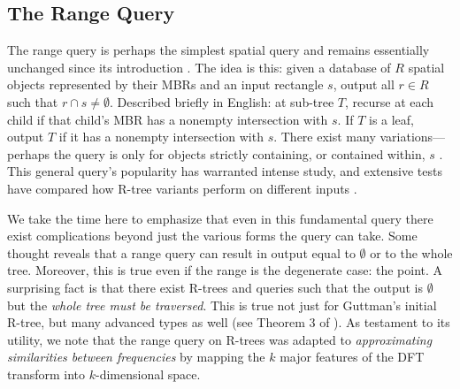 \subsection{The Range Query}
The range query is perhaps the simplest spatial query and remains essentially unchanged since its introduction \cite{guttman84}.
The idea is this: given a database of $R$ spatial objects represented by their MBRs and an input rectangle $s$, output all $r\in R$ such that $r\cap s\neq\emptyset$.
Described briefly in English: at sub-tree $T$, recurse at each child if that child's MBR has a nonempty intersection with $s$.
If $T$ is a leaf, output $T$ if it has a nonempty intersection with $s$.
There exist many variations---perhaps the query is only for objects strictly containing, or contained within, $s$ \cite{gaedegunther98}.
This general query's popularity has warranted intense study, and extensive tests have compared how R-tree variants perform on different inputs \cite{papadiassellistheodoridisegenhofer95}.

We take the time here to emphasize that even in this fundamental query there exist complications beyond just the various forms the query can take.
Some thought reveals that a range query can result in output equal to $\emptyset$ or to the whole tree.
Moreover, this is true even if the range is the degenerate case: the point.
A surprising fact is that there exist R-trees and queries such that the output is $\emptyset$ but the \emph{whole tree must be traversed}.
This is true not just for Guttman's initial R-tree, but many advanced types as well (see Theorem 3 of \cite{argeberghaverkortyi04}).
As testament to its utility, we note that the range query on R-trees was adapted to \emph{approximating similarities between frequencies} \cite{agrawalfaloutsosswami93} by mapping the $k$ major features of the DFT transform into $k$-dimensional space.

